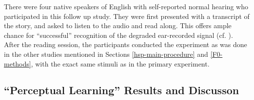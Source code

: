 \documentclass[dissertation,copyright]{uathesis}
\begin{document}
There were four native speakers of English with self-reported normal hearing who participated in this follow up study.  They were first presented with a transcript of the story, and asked to listen to the audio and read along.  This offers ample chance for ``successful'' recognition of the degraded ear-recorded signal (cf. \cite{davis:05}).  After the reading session, the participants conducted the experiment as was done in the other studies mentioned in Sections \ref{hsp-main-procedure} and \ref{F0-methods}, with the exact same stimuli as in the primary experiment.

\subsection{``Perceptual Learning'' Results and Discusson}



\end{document}
